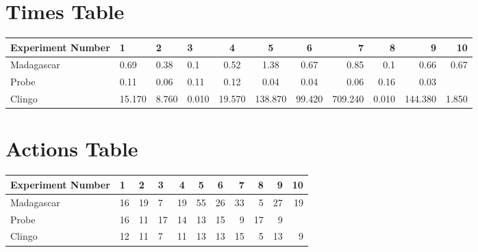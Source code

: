 \documentclass[8pt]{article}
\begin{document}
\begin{landscape}
\section{Times Table}\begin{tabular}{ | l | l | l | l | c | c | c | r | r | r | r | }\hline
Experiment Number & 1 & 2 & 3 & 4 & 5 & 6 & 7 & 8 & 9 & 10\\  \hline
Madagascar & 0.69 & 0.38 & 0.1 & 0.52 & 1.38 & 0.67 & 0.85 & 0.1 & 0.66 & 0.67\\  \hline
Probe & 0.11 & 0.06 & 0.11 & 0.12 & 0.04 & 0.04 & 0.06 & 0.16 & 0.03\\  \hline
Clingo & 15.170 & 8.760 & 0.010 & 19.570 & 138.870 & 99.420 & 709.240 & 0.010 & 144.380 & 1.850\\  \hline
\end{tabular}
\section{Actions Table}\begin{tabular}{ | l | l | l | l | c | c | c | r | r | r | r | }\hline
Experiment Number & 1 & 2 & 3 & 4 & 5 & 6 & 7 & 8 & 9 & 10\\ \hline
 Madagascar & 16 & 19 & 7 & 19 & 55 & 26 & 33 & 5 & 27 & 19\\ \hline
 Probe & 16 & 11 & 17 & 14 & 13 & 15 & 9 & 17 & 9\\ \hline
 Clingo & 12 & 11 & 7 & 11 & 13 & 13 & 15 & 5 & 13 & 9\\ \hline
\end{tabular}
\end{landscape}
\end{document}
